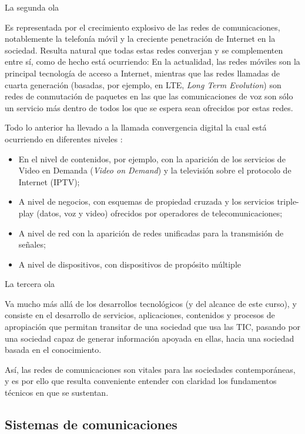 \documentclass[
]{book}
\providecommand{\tightlist}{%
  \setlength{\itemsep}{0pt}\setlength{\parskip}{0pt}}
\begin{document}
La segunda ola

Es representada por el crecimiento explosivo de las redes de comunicaciones, notablemente la telefonía móvil y la creciente penetración de Internet en la sociedad. Resulta natural que todas estas redes converjan y se complementen entre sí, como de hecho está ocurriendo: En la actualidad, las redes móviles son la principal tecnología de acceso a Internet, mientras que las redes llamadas de cuarta generación (basadas, por ejemplo, en LTE, \emph{Long Term Evolution}) son redes de conmutación de paquetes en las que las comunicaciones de voz son sólo un servicio más dentro de todos los que se espera sean ofrecidos por estas redes.

Todo lo anterior ha llevado a la llamada convergencia digital la cual está ocurriendo en diferentes niveles \citep{OECD:BS}:

\begin{itemize}
\tightlist
\item
  En el nivel de contenidos, por ejemplo, con la aparición de los servicios de Video en Demanda (\emph{Video on Demand}) y la televisión sobre el protocolo de Internet (IPTV);
\item
  A nivel de negocios, con esquemas de propiedad cruzada y los servicios triple-play (datos, voz y video) ofrecidos por operadores de telecomunicaciones;
\item
  A nivel de red con la aparición de redes unificadas para la transmisión de señales;
\item
  A nivel de dispositivos, con dispositivos de propósito múltiple
\end{itemize}

La tercera ola

Va mucho más allá de los desarrollos tecnológicos (y del alcance de este curso), y consiste en el desarrollo de servicios, aplicaciones, contenidos y procesos de apropiación que permitan transitar de una sociedad que usa las TIC, pasando por una sociedad capaz de generar información apoyada en ellas, hacia una sociedad basada en el conocimiento.

Así, las redes de comunicaciones son vitales para las sociedades contemporáneas, y es por ello que resulta conveniente entender con claridad los fundamentos técnicos en que se sustentan.

\hypertarget{sistemas-de-comunicaciones}{%
\subsection{Sistemas de comunicaciones}\label{sistemas-de-comunicaciones}}
\end{document}
